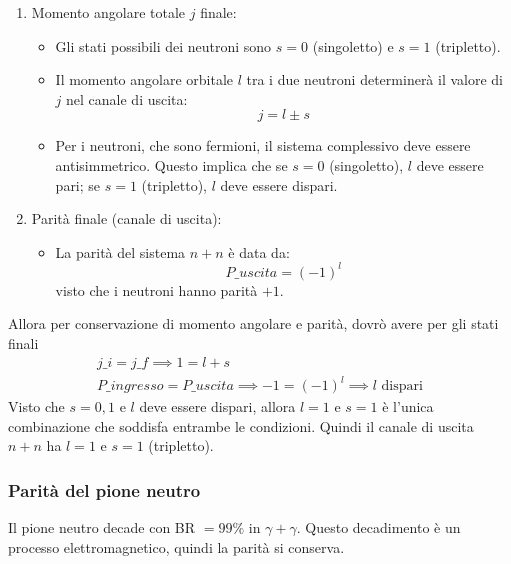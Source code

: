 \begin{enumerate}
    \item Momento angolare totale $j$ finale:
    \begin{itemize}
        \item Gli stati possibili dei neutroni sono $s=0$ (singoletto) e $s=1$ (tripletto).
        \item Il momento angolare orbitale $l$ tra i due neutroni determinerà il valore di $j$ nel canale di uscita:
        \begin{equation*}
        j=l\pm s
        \end{equation*}
        \item Per i neutroni, che sono fermioni, il sistema complessivo deve essere antisimmetrico. Questo implica che se $s=0$ (singoletto), $l$ deve essere pari; se $s=1$ (tripletto), $l$ deve essere dispari.
    \end{itemize} 
    \item Parità finale (canale di uscita):
    \begin{itemize}
        \item La parità del sistema $n+n$ è data da:
        \begin{equation*}
        P\_{uscita}=(-1)^l
        \end{equation*}
        visto che i neutroni hanno parità $+1$.
    \end{itemize}
\end{enumerate}
Allora per conservazione di momento angolare e parità, dovrò avere per gli stati finali 
\begin{gather*}
j\_i=j\_f\implies 1=l+s\\
P\_{ingresso}=P\_{uscita}\implies -1=(-1)^l\implies l \text{ dispari}
\end{gather*}
Visto che $s=0,1$ e $l$ deve essere dispari, allora $l=1$ e $s=1$ è l'unica combinazione che soddisfa entrambe le condizioni. Quindi il canale di uscita $n+n$ ha $l=1$ e $s=1$ (tripletto).
\subsubsection{Parità del pione neutro}
Il pione neutro decade con BR $=99\%$ in $\gamma+\gamma$. Questo decadimento è un processo elettromagnetico, quindi la parità si conserva.
